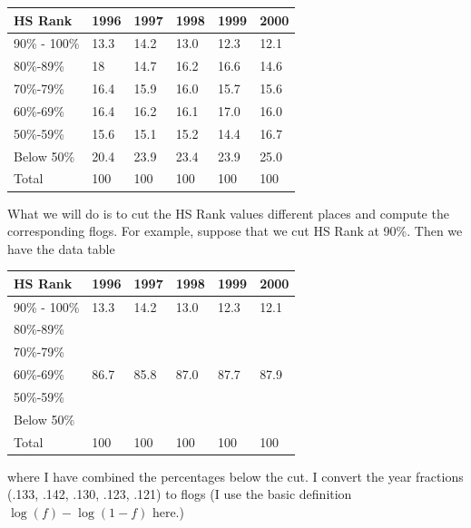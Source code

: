 \documentclass[
]{book}
\begin{document}
\begin{longtable}[]{@{}llllll@{}}
\toprule
HS Rank & 1996 & 1997 & 1998 & 1999 & 2000 \\
\midrule
\endhead
90\% - 100\% & 13.3 & 14.2 & 13.0 & 12.3 & 12.1 \\
80\%-89\% & 18 & 14.7 & 16.2 & 16.6 & 14.6 \\
70\%-79\% & 16.4 & 15.9 & 16.0 & 15.7 & 15.6 \\
60\%-69\% & 16.4 & 16.2 & 16.1 & 17.0 & 16.0 \\
50\%-59\% & 15.6 & 15.1 & 15.2 & 14.4 & 16.7 \\
Below 50\% & 20.4 & 23.9 & 23.4 & 23.9 & 25.0 \\
Total & 100 & 100 & 100 & 100 & 100 \\
\bottomrule
\end{longtable}

What we will do is to cut the HS Rank values different places and compute the corresponding flogs. For example, suppose that we cut HS Rank at 90\%. Then we have the data table

\begin{longtable}[]{@{}llllll@{}}
\toprule
HS Rank & 1996 & 1997 & 1998 & 1999 & 2000 \\
\midrule
\endhead
90\% - 100\% & 13.3 & 14.2 & 13.0 & 12.3 & 12.1 \\
80\%-89\% & & & & & \\
70\%-79\% & & & & & \\
60\%-69\% & 86.7 & 85.8 & 87.0 & 87.7 & 87.9 \\
50\%-59\% & & & & & \\
Below 50\% & & & & & \\
Total & 100 & 100 & 100 & 100 & 100 \\
\bottomrule
\end{longtable}

where I have combined the percentages below the cut. I convert the year fractions (.133, .142, .130, .123, .121) to flogs (I use the basic definition \(\log(f) - \log(1-f)\) here.)
\end{document}
